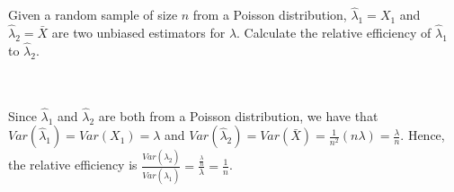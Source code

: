 Given a random sample of size $n$ from a Poisson distribution, $\hat{\lambda}_1=X_1$ and
$\hat{\lambda}_2=\bar{X}$ are two unbiased estimators for $\lambda$. Calculate the relative efficiency
of $\hat{\lambda}_1$ to $\hat{\lambda}_2$.\\\\

\begin{solution}\renewcommand{\qedsymbol}{}\ \\
    Since $\hat{\lambda}_1$ and $\hat{\lambda}_2$ are both from a Poisson distribution, we have that
    $Var(\hat{\lambda}_1)=Var(X_1)=\lambda$ and
    $Var(\hat{\lambda}_2)=Var(\bar{X})=\frac{1}{n^2}(n\lambda)=\frac{\lambda}{n}.$ Hence, the relative
    efficiency is
    $\frac{Var(\hat{\lambda}_2)}{Var(\hat{\lambda}_1)}=\frac{\frac{\lambda}{n}}{\lambda}=\frac1n$.

\end{solution}
